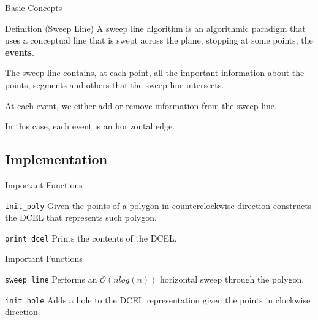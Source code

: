 \documentclass{beamer}
\begin{document}
\begin{frame}{Basic Concepts}
\begin{block}{Definition (Sweep Line)}
	A sweep line algorithm is an algorithmic paradigm that uses a conceptual line that is swept across the plane, stopping at some points, the \textbf{events}.
	
	\pause
	
	\bigbreak
	
	The sweep line contains, at each point, all the important information about the points, segments and others that the sweep line intersects.
	
	\pause
	
	\bigbreak
	
	At each event, we either add or remove information from the sweep line.
\end{block}

\pause

\bigbreak

In this case, each event is an horizontal edge.

\end{frame}

\subsection{Implementation}

\begin{frame}{Important Functions}
\begin{block}{\texttt{init\_poly}}
Given the points of a polygon in counterclockwise direction constructs the DCEL that represents such polygon.
\end{block}

\pause

\begin{block}{\texttt{print\_dcel}}
Prints the contents of the DCEL.
\end{block}
\end{frame}

\begin{frame}{Important Functions}
\begin{block}{\texttt{sweep\_line}}
Performs an $\mathcal{O} \left( n log \left( n \right) \right)$ horizontal sweep through the polygon.
\end{block}

\pause

\begin{block}{\texttt{init\_hole}}
Adds a hole to the DCEL representation given the points in clockwise direction.
\end{block}
\end{frame}
\end{document}
